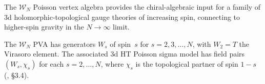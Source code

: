 \providecommand{\ModEnv}{\operatorname{ModEnv}}

The $\mathcal{W}_N$ Poisson vertex algebra provides the chiral-algebraic
input for a family of 3d holomorphic-topological gauge theories of
increasing spin, connecting to higher-spin gravity in the $N \to \infty$
limit.

\begin{definition}
\label{def:wn-field-content}
The $\mathcal{W}_N$ PVA has generators $W_s$ of spin~$s$ for
$s = 2, 3, \ldots, N$, with $W_2 = T$ the Virasoro element. The
associated 3d HT Poisson sigma model has field pairs $(W_s, \chi_s)$
for each $s = 2, \ldots, N$, where $\chi_s$ is the topological partner
of spin $1-s$ \textup{(}\!\cite{KZ25}, \S3.4\textup{)}.
\end{definition}

